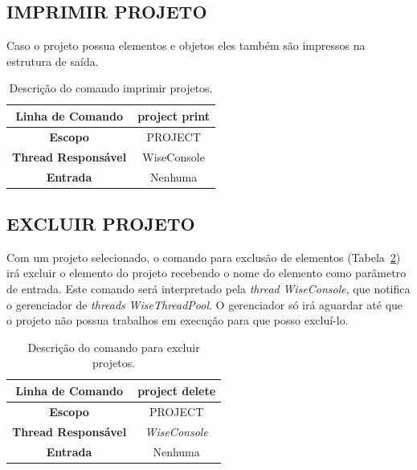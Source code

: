 \subsection{IMPRIMIR PROJETO}\label{sec:print_projects}

 Caso o projeto possua elementos e objetos eles também são impressos na estrutura de saída.

\begin{center}
	\begin{table}[!htbp]
		\begin{tabularx}{\textwidth}{c|X}
			\toprule
			\textbf{Linha de Comando} & \multicolumn{1}{c}{project print} \\
			\midrule
			\textbf{Escopo} & \multicolumn{1}{c}{PROJECT} \\
			\hline
			\textbf{Thread Responsável} & \multicolumn{1}{c}{WiseConsole} \\
			\hline
			\textbf{Entrada} & \multicolumn{1}{c}{Nenhuma} \\
			\bottomrule
		\end{tabularx}
		\caption{Descrição do comando imprimir projetos.}
		\label{tab:print_projects}
	\end{table}
\end{center}

\subsection{EXCLUIR PROJETO}\label{sec:delete_projects}

Com um projeto selecionado, o comando para exclusão de elementos (Tabela~\ref{tab:delete_projects}) irá excluir o elemento do projeto recebendo o nome do elemento como parâmetro de entrada. Este comando será interpretado pela \textit{thread} \textit{WiseConsole}, que notifica o gerenciador de \textit{threads} \textit{WiseThreadPool}. O gerenciador só irá aguardar até que o projeto não possua trabalhos em execução para que posso excluí-lo.

\begin{center}
	\begin{table}[!htbp]
		\begin{tabularx}{\textwidth}{c|X}
			\toprule
			\textbf{Linha de Comando} & \multicolumn{1}{c}{project delete} \\
			\midrule
			\textbf{Escopo} & \multicolumn{1}{c}{PROJECT} \\
			\hline
			\textbf{Thread Responsável} & \multicolumn{1}{c}{\textit{WiseConsole}} \\
			\hline
			\textbf{Entrada} & \multicolumn{1}{c}{Nenhuma} \\
			\bottomrule
		\end{tabularx}
		\caption{Descrição do comando para excluir projetos.}
		\label{tab:delete_projects}
	\end{table}
\end{center}

